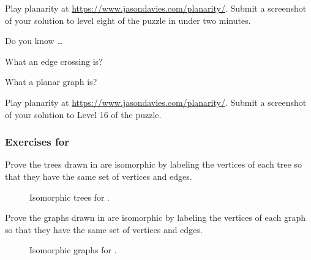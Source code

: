 \begin{exer}[\exerU] %
\label{exer_play_planarity}
    Play planarity at \url{https://www.jasondavies.com/planarity/}. Submit a screenshot of your solution to level eight of the puzzle in under two minutes.
\end{exer}

\begin{exer}[\exerR] %
\label{exer_dyk_planarity}
    Do you know \ldots
        \begin{exerpart}
            \item What an edge crossing is?
            \item What a planar graph is?
        \end{exerpart}
\end{exer}

\begin{exer}[\exerE] %
\label{exer_play_planarity_higher_level}
    Play planarity at \url{https://www.jasondavies.com/planarity/}. Submit a screenshot of your solution to Level 16 of the puzzle.
\end{exer}


\subsubsection*{Exercises for 
\subisograph}

\begin{exer}[\exerP] %
\label{exer_show_tree_ism}
    Prove the trees drawn in  are isomorphic by labeling the vertices of each tree so that they have the same set of vertices and edges.  
        \begin{figure}[hbtp]
            \centering
            
            \caption{Isomorphic trees for  .}
            \label{fig_ism_trees_easy}
        \end{figure}
\end{exer}

\begin{exer}[\exerP] %
\label{exer_show_graph_ism}
    Prove the graphs drawn in  are isomorphic by labeling the vertices of each graph so that they have the same set of vertices and edges. 
        \begin{figure}[hbtp]
            \centering
            
            \caption{Isomorphic graphs for .}
            \label{fig_ism_Ham5}
        \end{figure}
\end{exer}

